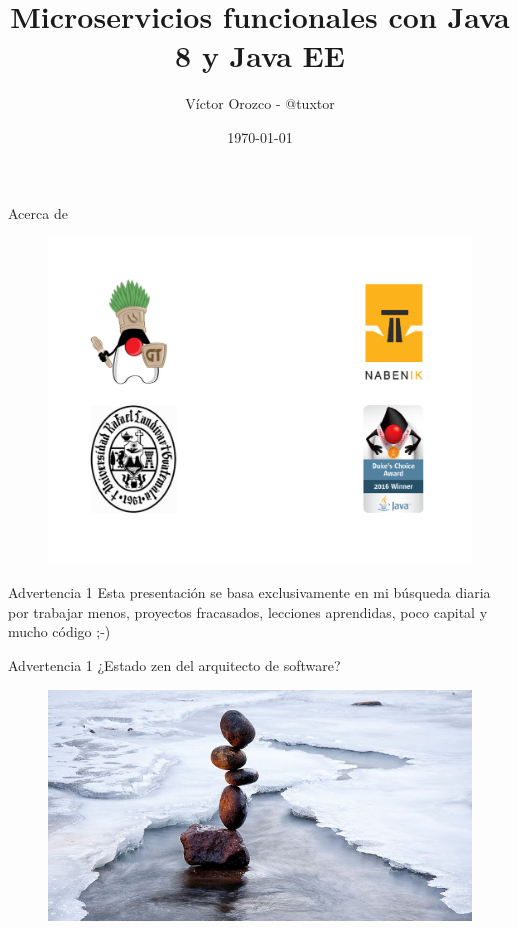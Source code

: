 \documentclass{beamer}
\title{Microservicios funcionales con Java 8 y Java EE}
\author{Víctor Orozco - @tuxtor}
\institute{Java Cloud Day Mexico 2017}
\date{\today}
\begin{document}
\frame{\titlepage}

\begin{frame}{Acerca de}
\begin{figure}
	\centering
	\includegraphics[width=\linewidth]{Images/fescudos}
\end{figure}
\end{frame}

\begin{frame}{Advertencia 1}
\huge Esta presentación se basa exclusivamente en mi búsqueda diaria por trabajar menos, proyectos fracasados, lecciones aprendidas, poco capital y mucho código ;-)
\end{frame}

\begin{frame}{Advertencia 1}
¿Estado zen del arquitecto de software?
\begin{figure}
	\centering
	\includegraphics[width=\linewidth]{Images/zen}
\end{figure}
\end{frame}
\end{document}
